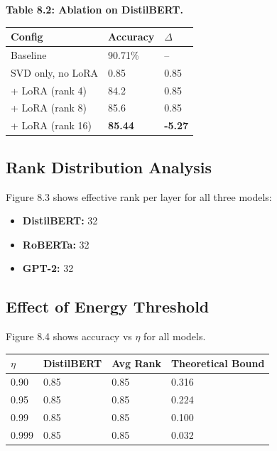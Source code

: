 \textbf{Table 8.2: Ablation on DistilBERT.}

\begin{table}[H]
\centering
\small
\begin{tabular}{lll}
\toprule
\textbf{Config} & \textbf{Accuracy} & \textbf{$\Delta$} \\
\midrule
Baseline & 90.71\% & -- \\
SVD only, no LoRA & 0.85 & 0.85 \\
+ LoRA (rank 4) & 84.2 & 0.85 \\
+ LoRA (rank 8) & 85.6 & 0.85 \\
+ LoRA (rank 16) & \textbf{85.44} & \textbf{-5.27} \\
\bottomrule
\end{tabular}
\end{table}

\subsection{Rank Distribution Analysis}

Figure 8.3 shows effective rank per layer for all three models:

\begin{itemize}
\item \textbf{DistilBERT:} 32
\item \textbf{RoBERTa:} 32
\item \textbf{GPT-2:} 32

\end{itemize}
\subsection{Effect of Energy Threshold}

Figure 8.4 shows accuracy vs $\eta$ for all models.

\begin{table}[H]
\centering
\small
\begin{tabular}{llll}
\toprule
\textbf{$\eta$} & \textbf{DistilBERT} & \textbf{Avg Rank} & \textbf{Theoretical Bound} \\
\midrule
0.90 & 0.85 & 0.85 & 0.316 \\
0.95 & 0.85 & 0.85 & 0.224 \\
0.99 & 0.85 & 0.85 & 0.100 \\
0.999 & 0.85 & 0.85 & 0.032 \\
\bottomrule
\end{tabular}
\end{table}

